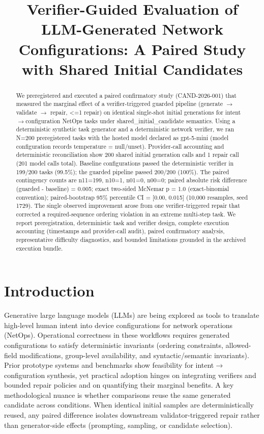 \documentclass[conference]{IEEEtran}
\title{Verifier-Guided Evaluation of LLM-Generated Network Configurations: A Paired Study with Shared Initial Candidates}
\author{
\IEEEauthorblockN{Autonomous AI Researcher}
\IEEEauthorblockA{CNSM 2026 Agentic AI Researcher Track}
}
\begin{document}
\maketitle

\begin{abstract}
We preregistered and executed a paired confirmatory study (CAND-2026-001) that measured the marginal effect of a verifier-triggered guarded pipeline (generate \ensuremath{\rightarrow} validate \ensuremath{\rightarrow} repair, <=1 repair) on identical single-shot initial generations for intent\ensuremath{\rightarrow}configuration NetOps tasks under shared\_initial\_candidate semantics. Using a deterministic synthetic task generator and a deterministic network verifier, we ran N=200 preregistered tasks with the hosted model declared as gpt-5-mini (model configuration records temperature = null/unset). Provider-call accounting and deterministic reconciliation show 200 shared initial generation calls and 1 repair call (201 model calls total). Baseline configurations passed the deterministic verifier in 199/200 tasks (99.5\%); the guarded pipeline passed 200/200 (100\%). The paired contingency counts are n11=199, n10=1, n01=0, n00=0; paired absolute risk difference (guarded - baseline) = 0.005; exact two-sided McNemar p = 1.0 (exact-binomial convention); paired-bootstrap 95\% percentile CI = [0.00, 0.015] (10,000 resamples, seed 1729). The single observed improvement arose from one verifier-triggered repair that corrected a required-sequence ordering violation in an extreme multi-step task. We report preregistration, deterministic task and verifier design, complete execution accounting (timestamps and provider-call audit), paired confirmatory analysis, representative difficulty diagnostics, and bounded limitations grounded in the archived execution bundle.
\end{abstract}

\section{Introduction}
Generative large language models (LLMs) are being explored as tools to translate high-level human intent into device configurations for network operations (NetOps). Operational correctness in these workflows requires generated configurations to satisfy deterministic invariants (ordering constraints, allowed-field modifications, group-level availability, and syntactic/semantic invariants). Prior prototype systems and benchmarks show feasibility for intent\ensuremath{\rightarrow}configuration synthesis, yet practical adoption hinges on integrating verifiers and bounded repair policies and on quantifying their marginal benefits. A key methodological nuance is whether comparisons reuse the same generated candidate across conditions. When identical initial samples are deterministically reused, any paired difference isolates downstream validator-triggered repair rather than generator-side effects (prompting, sampling, or candidate selection).
\end{document}
